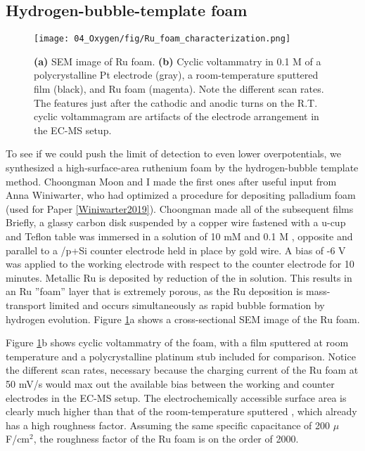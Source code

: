 \subsection{Hydrogen-bubble-template  foam}\label{subsec:Ru_foam}

\begin{figure}[h!]
	\centering
	\texttt{[image: 04\_Oxygen/fig/Ru\_foam\_characterization.png]}
	\caption{\textbf{(a)} SEM image of Ru foam. \textbf{(b)} Cyclic voltammatry in 0.1 M  of a polycrystalline Pt electrode (gray), a room-temperature sputtered  film (black), and Ru foam (magenta). Note the different scan rates. The features just after the cathodic and anodic turns on the R.T.  cyclic voltammagram are artifacts of the electrode arrangement in the EC-MS setup.}
	\label{fig:Ru_foam_char}
\end{figure}

To see if we could push the limit of  detection to even lower overpotentials, we synthesized a high-surface-area ruthenium foam by the hydrogen-bubble template method. Choongman Moon and I made the first ones after useful input from Anna Winiwarter, who had optimized a procedure for depositing palladium foam (used for Paper \ref{Winiwarter2019}). Choongman made all of the subsequent films Briefly, a glassy carbon disk suspended by a copper wire fastened with a u-cup and Teflon table was immersed in a solution of 10 mM  and 0.1 M , opposite and parallel to a /p+Si counter electrode held in place by gold wire. A bias of -6 V was applied to the working electrode with respect to the counter electrode for 10 minutes. Metallic Ru is deposited by reduction of the  in solution. This results in an Ru ''foam'' layer that is extremely porous, as the Ru deposition is mass-transport limited and occurs simultaneously as rapid bubble formation by hydrogen evolution. Figure \ref{fig:Ru_foam_char}a shows a cross-sectional SEM image of the Ru foam.

Figure \ref{fig:Ru_foam_char}b shows cyclic voltammatry of the  foam, with a  film sputtered at room temperature and a polycrystalline platinum stub included for comparison. Notice the different scan rates, necessary because the charging current of the Ru foam at 50 mV/s would max out the available bias between the working and counter electrodes in the EC-MS setup. The electrochemically accessible surface area is clearly much higher than that of the room-temperature sputtered , which already has a high roughness factor. Assuming the same specific capacitance of 200 $\mu$F/cm$^{2}$\cite{Yoshida2013}, the roughness factor of the Ru foam is on the order of 2000.

